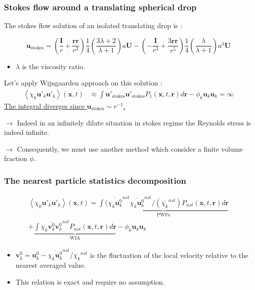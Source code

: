 \documentclass{sintefbeamer}
\newcommand{\avg}[1]{\left<#1\right>}
\newcommand{\nstavg}[1]{\overline{#1}^{nst}}
\begin{document}
\begin{frame}
  \frametitle{Stokes flow around a translating spherical drop}
  The stokes flow solution of an isolated translating drop is :

  \begin{equation*}
    \textbf{u}_\text{stokes} 
    = \left(\frac{ \textbf{I}}{r} + \frac{\textbf{rr}}{r^3}\right)  \frac{1}{4}\left(\frac{3\lambda + 2}{\lambda +1}\right) a \textbf{U}
    - \left(-\frac{\textbf{I}}{r^3} + \frac{3 \textbf{rr} }{r^5}\right)  \frac{1}{4}\left(\frac{\lambda}{\lambda +1}\right) a^3 \textbf{U}
  \end{equation*}

  \begin{itemize}
    \item $\lambda$ is the viscosity ratio.
  \end{itemize}
  
  Let's apply Wijngaarden approach on this solution : 
  \begin{align*}
    \avg{\chi_k \textbf{u}'_k\textbf{u}'_k}(\textbf{x},t)
    &\approx \int \textbf{u}'_\text{stokes}\textbf{u}'_\text{stokes}  P_1(\textbf{x},t,\textbf{r}) d\textbf{r}
    - \phi_k \textbf{u}_k\textbf{u}_k
    =\infty 
  \end{align*}
  \underline{The integral diverges since $\textbf{u}_\text{stokes} \sim r^{-1}$.}

  $\to$ Indeed in an infinitely dilute situation in stokes regime the Reynolds stress is indeed infinite.

  $\to$ Consequently, we must use another method which consider a finite volume fraction $\phi$. 
\end{frame}

\begin{frame}
  \frametitle{The nearest particle statistics decomposition}
  \begin{multline*}
    \avg{\chi_k \textbf{u}'_k\textbf{u}'_k}(\textbf{x},t)
    = 
    \underbrace{\int (\nstavg{\chi_k \textbf{u}^0_k}  \nstavg{\chi_k \textbf{u}^0_k} / (\nstavg{\chi_k})  P_{nst}(\textbf{x},t,\textbf{r}) d\textbf{r} }_\text{PWFs}
    \\+\underbrace{\int \nstavg{\chi_k \textbf{v}_k^0\textbf{v}_k^0}  P_{nst}(\textbf{x},t,\textbf{r}) d\textbf{r}}_\text{WIA}
    - \phi_k \textbf{u}_k\textbf{u}_k
  \end{multline*}

\begin{itemize}
  \item $\textbf{v}_k^0  = \textbf{u}_k^0 - \nstavg{\chi_k \textbf{u}^0_k} / \nstavg{\chi_k}$ is the fluctuation of the local velocity relative to the nearest averaged value. 
  \item This relation is exact and require no assumption. 
\end{itemize}
\end{frame}
\end{document}
